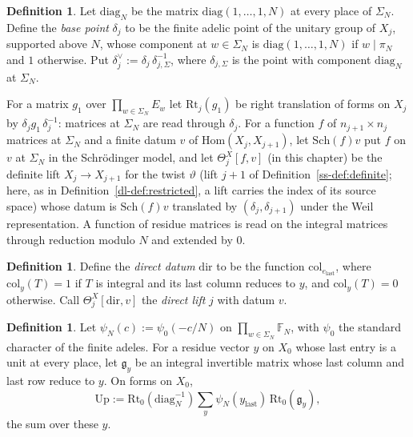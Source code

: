 \documentclass[reqno]{amsart}
\newcounter{chap}
\theoremstyle{plain}
\theoremstyle{definition}
\newtheorem{definition}[theorem]{Definition}
\theoremstyle{remark}
\newcommand{\F}{{\mathbb{F}}}
\newcommand{\Up}{\mathrm{Up}}
\newcommand{\Rt}{\mathrm{Rt}}
\newcommand{\Sch}{\mathrm{Sch}}
\newcommand{\dir}{\mathrm{dir}}
\newcommand{\col}{\mathrm{col}}
\newcommand{\dg}{\mathrm{diag}_N}
\newcommand{\elast}{e_{\mathrm{last}}}
\begin{document}
\begin{definition}\label{def:base-point}
Let \(\dg\) be the matrix \(\mathrm{diag}(1, \dots, 1, N)\) at every place of \(\Sigma_N\).  Define the \emph{base point} \(\delta_j\) to be the finite adelic point of the unitary group of \(X_j\), supported above \(N\), whose component at \(w \in \Sigma_N\) is \(\mathrm{diag}(1, \dots, 1, N)\) if \(w \mid \pi_N\) and \(1\) otherwise.  Put \(\delta_j^\vee := \delta_j\,\delta_{j,\Sigma}^{-1}\), where \(\delta_{j,\Sigma}\) is the point with component \(\dg\) at \(\Sigma_N\).
\end{definition}

For a matrix \(g_1\) over \(\prod_{w \in \Sigma_N}E_w\) let \(\Rt_j(g_1)\) be right translation of forms on \(X_j\) by \(\delta_j g_1\,\delta_j^{-1}\): matrices at \(\Sigma_N\) are read through \(\delta_j\).  For a function \(f\) of \(n_{j+1} \times n_j\) matrices at \(\Sigma_N\) and a finite datum \(v\) of \(\mathrm{Hom}(X_j, X_{j+1})\), let \(\Sch(f)v\) put \(f\) on \(v\) at \(\Sigma_N\) in the Schr\"odinger model, and let \(\Theta^X_j[f, v]\) (in this chapter) be the definite lift \(X_j \to X_{j+1}\) for the twist \(\vartheta\) (lift \(j+1\) of Definition~\ref{ss-def:definite}; here, as in Definition~\ref{dl-def:restricted}, a lift carries the index of its source space) whose datum is \(\Sch(f)v\) translated by \((\delta_j, \delta_{j+1})\) under the Weil representation.  A function of residue matrices is read on the integral matrices through reduction modulo \(N\) and extended by \(0\).

\begin{definition}\label{def:direct}
Define the \emph{direct datum} \(\dir\) to be the function \(\col_{\elast}\), where \(\col_y(T) = 1\) if \(T\) is integral and its last column reduces to \(y\), and \(\col_y(T) = 0\) otherwise.  Call \(\Theta^X_j[\dir, v]\) the \emph{direct lift} \(j\) with datum \(v\).
\end{definition}

\begin{definition}\label{def:up}
Let \(\psi_N(c) := \psi_0(-c/N)\) on \(\prod_{w \in \Sigma_N}\F_N\), with \(\psi_0\) the standard character of the finite adeles.  For a residue vector \(y\) on \(X_0\) whose last entry is a unit at every place, let \(\mathfrak g_y\) be an integral invertible matrix whose last column and last row reduce to \(y\).  On forms on \(X_0\),
\[
  \Up := \Rt_0(\dg^{-1}) \sum_{y} \psi_N(y_{\mathrm{last}})\,\Rt_0(\mathfrak g_y),
\]
the sum over these \(y\).
\end{definition}
\end{document}
